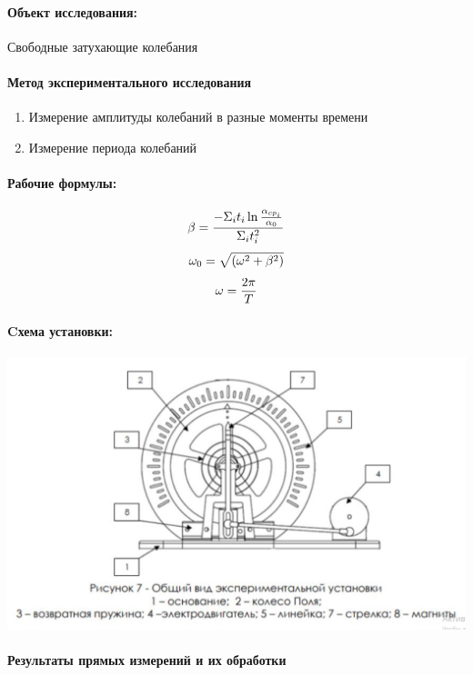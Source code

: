 \documentclass{article}
\begin{document}
	\paragraph{Объект исследования:}
	Свободные затухающие колебания
	\paragraph{Метод экспериментального исследования}
	\begin{enumerate}
		\item Измерение амплитуды колебаний в разные моменты времени
		\item Измерение периода колебаний
	\end{enumerate}
	\paragraph{Рабочие формулы:}
	\begin{equation}
		\large{\beta}=\frac{-\Sigma_it_i\ln{\frac{\alpha_{cp_i}}{\alpha_0}}}{\Sigma_it_{i}^2}
	\end{equation}
	\begin{equation}
		\large{\omega_0} = \sqrt{(\omega^2+\beta^2)}
	\end{equation}
	\begin{equation}
		\large{\omega} = \frac{2\pi}{T}
	\end{equation}
	
	
	\paragraph{Cхема установки:}
	\begin{center}
		\includegraphics[scale=0.5]{Маятник Поля 2}
	\end{center}
	\paragraph{Результаты прямых измерений и их обработки}
	
\end{document}
